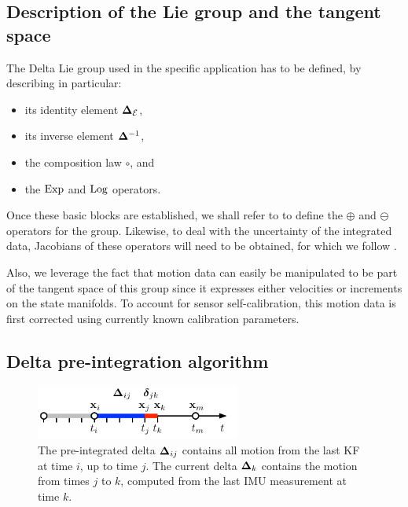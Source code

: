 \subsection{Description of the Lie group and the tangent space}

The Delta Lie group used in the specific application has to be defined, by describing in particular:
%
\begin{itemize}
    \item its identity element ${{\bm \Delta}}_{\mathcal{E}}$, 
    \item its inverse element ${{\bm \Delta}}^{-1}$, 
    \item the composition law $\circ$, and 
    \item the $\operatorname*{Exp}$ and $\operatorname*{Log}$ operators.  
\end{itemize}
%
Once these basic blocks are established, we shall refer to  to define the $\oplus$ and $\ominus$ operators for the group.
Likewise, to deal with the uncertainty of the integrated data, Jacobians of these operators will need to be obtained, for which we follow \cite{sola2018micro}.

Also, we leverage the fact that motion data can easily be manipulated to be part of the tangent space of this group since it expresses either velocities or increments on the
state manifolds. To account for sensor self-calibration, this motion data is first corrected using currently known calibration parameters. %

\subsection{Delta pre-integration algorithm}

\begin{figure}[tb]
    \centering
    \includegraphics[width=0.6\textwidth]{figures/delta_time}
    \caption{The pre-integrated delta ${{\bm \Delta}}_{ij}$ contains all motion from the last KF at time $i$, up to time $j$. 
    The current delta ${{\bm \Delta}}_k$ contains the motion from times $j$ to $k$, computed from the last IMU measurement at time $k$.}
    \label{fig:delta_time}
\end{figure}

